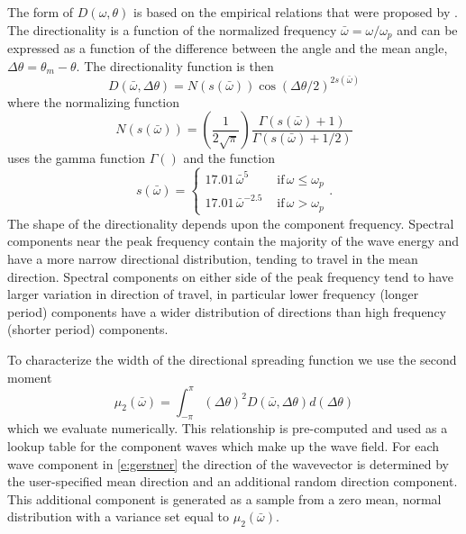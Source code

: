 \documentclass[utf8]{frontiersSCNS} %
\begin{document}
The form of $D(\omega,\theta)$ is based on the empirical relations that were proposed by \citet{mitsuyasu75observations}. The directionality is a function of the normalized frequency $\bar{\omega}=\omega/\omega_p$ and can be expressed as a function of the difference between the angle and the mean angle, $\Delta\theta = \theta_m-\theta$. The directionality function is then
\begin{equation}
D(\bar{\omega},\Delta\theta) = N(s(\bar{\omega})) \cos{(\Delta\theta/2)}^{2s(\bar{\omega})}
\end{equation}
where the normalizing function
\begin{equation}
N(s(\bar{\omega})) = \left(\frac{1}{2\sqrt{\pi}}\right) \frac{\Gamma(s(\bar{\omega})+1)}{\Gamma(s(\bar{\omega})+1/2)}
\end{equation}
uses the gamma function $\Gamma()$ and the function
\begin{equation}
s(\bar{\omega}) = \left\{
\begin{array}{ll}
  17.01 \, \bar{\omega}^5 \,\, & \mathrm{if} \, \omega \leq \omega_p \\
  17.01 \, \bar{\omega}^{-2.5}  \,\, & \mathrm{if} \, \omega > \omega_p
\end{array}
\right. .
\end{equation}
The shape of the directionality depends upon the component frequency. Spectral components near the peak frequency contain the majority of the wave energy and have a more narrow directional distribution, tending to travel in the mean direction. Spectral components on either side of the peak frequency tend to have larger variation in direction of travel, in particular lower frequency (longer period) components have a wider distribution of directions than high frequency (shorter period) components. 

To characterize the width of the directional spreading function we use the second moment
\begin{equation}
\mu_2(\bar{\omega}) = \int_{-\pi}^{\pi}(\Delta\theta)^2 D(\bar{\omega},\Delta\theta) d(\Delta\theta)
\end{equation}
which we evaluate numerically. This relationship is pre-computed and used as a lookup table for the component waves which make up the wave field. For each wave component in \eqref{e:gerstner} the direction of the wavevector is determined by the user-specified mean direction and an additional random direction component. This additional component is generated as a sample from a zero mean, normal distribution with a variance set equal to $\mu_2(\bar{\omega})$. 
\end{document}
